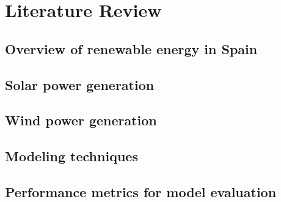 \section{Literature Review}
\subsection{Overview of renewable energy in Spain}
\subsection{Solar power generation}
\subsection{Wind power generation}
\subsection{Modeling techniques}
\subsection{Performance metrics for model evaluation}